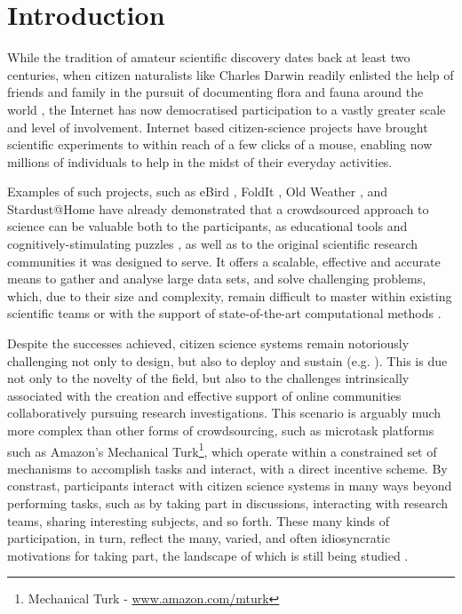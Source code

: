 \documentclass{sigchi}
\begin{document}

\section{Introduction}


While the tradition of amateur scientific discovery dates back at least two centuries, when citizen naturalists like Charles Darwin readily enlisted the help of friends and family in the pursuit of documenting flora and fauna around the world \cite{silvertown2009new}, the Internet has now democratised participation to a vastly greater scale and level of involvement.  Internet based citizen-science projects have brought scientific experiments to within reach of a few clicks of a mouse, enabling now millions of individuals to help in the midst of their everyday activities.

Examples of such projects, such as eBird \cite{wood2011ebird}, FoldIt \cite{khatib2011algorithm}, Old Weather \cite{}, and Stardust@Home \cite{westphal2005stardust} have already demonstrated that a crowdsourced approach to science can be valuable both to the participants, as educational tools and cognitively-stimulating puzzles \cite{gray2012lessons}, as well as to the original scientific research communities it was designed to serve. It offers a scalable, effective and accurate means to gather and analyse large data sets, and solve challenging problems, which, due to their size and complexity, remain difficult to master within existing scientific teams or with the support of state-of-the-art computational methods \cite{fortson2011galaxy,lintott2008galaxy,simpson2013dynamic}. %


Despite the successes achieved, citizen science systems remain notoriously challenging not only to design, but also to deploy and sustain (e.g. \cite{ebird, ubiome, druschke2012failures}). This is due not only to the novelty of the field, but also to the challenges intrinsically associated with the creation and effective support of online communities collaboratively pursuing research investigations. This scenario is arguably much more complex than other forms of crowdsourcing, such as microtask platforms such as Amazon's Mechanical Turk\footnote{Mechanical Turk - \url{www.amazon.com/mturk}}, which operate within a constrained set of mechanisms to accomplish tasks and interact, with a direct incentive scheme. By constrast, participants  interact with citizen science systems in many ways beyond performing tasks, such as by taking part in discussions, interacting with research teams, sharing interesting subjects, and so forth.  These many kinds of participation, in turn, reflect the many, varied, and often idiosyncratic motivations for taking part, the landscape of which is still being studied \cite{raddick2010galaxy}.
\end{document}
